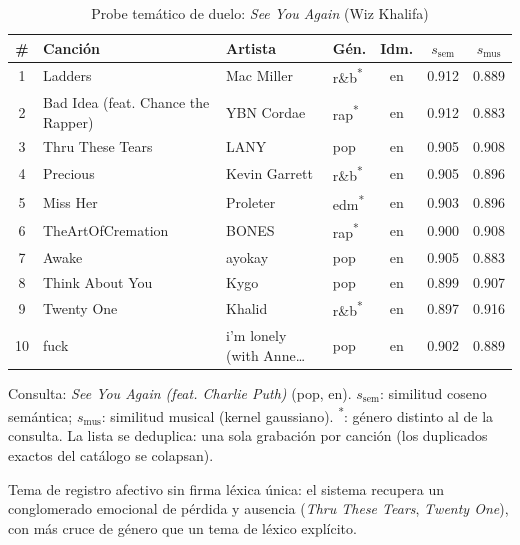 \begin{table}[htbp]
  \centering
  \begin{threeparttable}
  \caption{Probe temático de duelo: \emph{See You Again} (Wiz Khalifa)}
  \label{tab:qual_probe_duelo}
  \small
  \setlength{\tabcolsep}{4pt}
  \begin{tabular}{@{}c >{\raggedright\arraybackslash}p{4.0cm} >{\raggedright\arraybackslash}p{2.8cm} l c c c@{}}
    \toprule
    \# & Canción & Artista & Gén. & Idm. & $s_{\text{sem}}$ & $s_{\text{mus}}$ \\
    \midrule
    1 & Ladders & Mac Miller & r\&b\textsuperscript{*} & en & 0.912 & 0.889 \\
    2 & Bad Idea (feat. Chance the Rapper) & YBN Cordae & rap\textsuperscript{*} & en & 0.912 & 0.883 \\
    3 & Thru These Tears & LANY & pop & en & 0.905 & 0.908 \\
    4 & Precious & Kevin Garrett & r\&b\textsuperscript{*} & en & 0.905 & 0.896 \\
    5 & Miss Her & Proleter & edm\textsuperscript{*} & en & 0.903 & 0.896 \\
    6 & TheArtOfCremation & BONES & rap\textsuperscript{*} & en & 0.900 & 0.908 \\
    7 & Awake & ayokay & pop & en & 0.905 & 0.883 \\
    8 & Think About You & Kygo & pop & en & 0.899 & 0.907 \\
    9 & Twenty One & Khalid & r\&b\textsuperscript{*} & en & 0.897 & 0.916 \\
    10 & fuck & i'm lonely (with Anne\ldots & pop & en & 0.902 & 0.889 \\
    \bottomrule
  \end{tabular}
  \begin{tablenotes}[flushleft]
    \small
    \item Consulta: \emph{See You Again (feat. Charlie Puth)} (pop, en). $s_{\text{sem}}$: similitud coseno semántica; $s_{\text{mus}}$: similitud musical (kernel gaussiano). \textsuperscript{*}: género distinto al de la consulta. La lista se deduplica: una sola grabación por canción (los duplicados exactos del catálogo se colapsan).
    \item Tema de registro afectivo sin firma léxica única: el sistema recupera un conglomerado emocional de pérdida y ausencia (\emph{Thru These Tears}, \emph{Twenty One}), con más cruce de género que un tema de léxico explícito.
  \end{tablenotes}
  \end{threeparttable}
\end{table}
